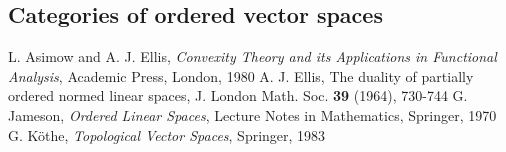 \documentclass[12pt]{article}
\theoremstyle{remark}
\newcommand{\<}{\langle}
\begin{document}
\subsection{Categories of ordered vector spaces}


\begin{thebibliography}{99}
 L. Asimow and A. J. Ellis, \emph{ Convexity Theory and its Applications in Functional Analysis}, Academic Press, London, 1980
 A. J. Ellis, The duality of partially ordered normed linear spaces, J. London Math. Soc. \textbf{39} (1964), 730-744
G. Jameson, \emph{Ordered Linear Spaces}, Lecture Notes in Mathematics, Springer, 1970
 G. K\" othe, \emph{Topological Vector Spaces}, Springer, 1983
\end{thebibliography}
\end{document}
